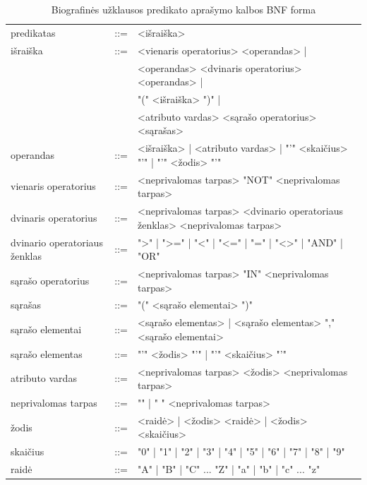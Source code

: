 \begin{table}[H]\footnotesize
	\centering
	\begin{tabular}{|l c l|}
		\hline
		predikatas                    & ::= & <išraiška> \\
		išraiška                      & ::= & <vienaris operatorius> <operandas> | \\
									  &     & \multicolumn{1}{l|}{<operandas> <dvinaris operatorius> <operandas> |} \\
									  &     & \multicolumn{1}{l|}{"(" <išraiška> ")" |} \\
									  &     & \multicolumn{1}{l|}{ <atributo vardas> <sąrašo operatorius> <sąrašas>} \\
		operandas                     & ::= & <išraiška> | <atributo vardas> | "'" <skaičius> "'" | "'" <žodis> "'" \\
		vienaris operatorius          & ::= & <neprivalomas tarpas> "NOT" <neprivalomas tarpas> \\
		dvinaris operatorius          & ::= & <neprivalomas tarpas> <dvinario operatoriaus ženklas> <neprivalomas tarpas> \\
		dvinario operatoriaus ženklas & ::= & ">" | ">=" | "<" | "<=" | "=" | "<>" | "AND" | "OR" \\
		sąrašo operatorius            & ::= & <neprivalomas tarpas> "IN" <neprivalomas tarpas> \\
		sąrašas                       & ::= & "(" <sąrašo elementai> ")" \\
		sąrašo elementai              & ::= & <sąrašo elementas> | <sąrašo elementas> "," <sąrašo elementai> \\
		sąrašo elementas              & ::= & "'" <žodis> "'" | "'" <skaičius> "'" \\
		atributo vardas               & ::= & <neprivalomas tarpas> <žodis> <neprivalomas tarpas> \\
		neprivalomas tarpas           & ::= & "" | " " <neprivalomas tarpas> \\
		žodis                         & ::= & <raidė> | <žodis> <raidė> | <žodis> <skaičius> \\
		skaičius                      & ::= & "0" | "1" | "2" | "3" | "4" | "5" | "6" | "7" | "8" | "9" \\
		raidė                         & ::= & "A" | "B" | "C" ... "Z" | "a" | "b" | "c" ... "z"  \\
		\hline
	\end{tabular}
	\caption{Biografinės užklausos predikato aprašymo kalbos BNF forma}
	\label{tab:queryBNF}
\end{table}

